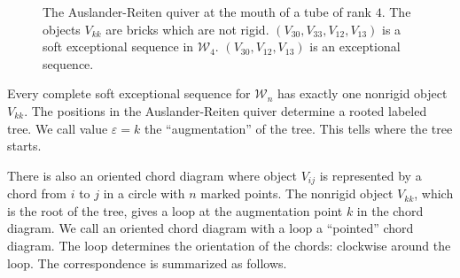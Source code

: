 \documentclass[11pt]{amsart}
\theoremstyle{definition}
\theoremstyle{remark}
\numberwithin{equation}{section}
\newcommand{\cW}{\ensuremath{{\mathcal{W}}}}
\begin{document}
%
\begin{figure}[htbp]
\begin{center}
\caption{The Auslander-Reiten quiver at the mouth of a tube of rank $4$. The objects $V_{kk}$ are bricks which are not rigid. $(V_{30},V_{33},V_{12},V_{13})$ is a soft exceptional sequence in $\cW_4$. $(V_{30},V_{12},V_{13})$ is an exceptional sequence.}
\label{AR quiver W4}
\end{center}
\end{figure}
%

Every complete soft exceptional sequence for $\cW_n$ has exactly one nonrigid object $V_{kk}$. The positions in the Auslander-Reiten quiver determine a rooted labeled tree. We call value $\varepsilon=k$ the ``augmentation'' of the tree. This tells where the tree starts.


There is also an oriented chord diagram where object $V_{ij}$ is represented by a chord from $i$ to $j$ in a circle with $n$ marked points. The nonrigid object $V_{kk}$, which is the root of the tree, gives a loop at the augmentation point $k$ in the chord diagram. We call an oriented chord diagram with a loop a ``pointed'' chord diagram. The loop determines the orientation of the chords: clockwise around the loop. The correspondence is summarized as follows.
\end{document}
